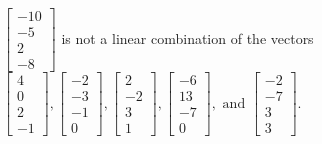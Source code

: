 \begin{exercise}
\begin{exerciseStatement}
  \end{exerciseStatement}
  \begin{exerciseAnswer}
   \(\left[\begin{array}{c}
-10 \\
-5 \\
2 \\
-8
\end{array}\right]\) 
  	 is not  
	a linear combination of the vectors \(\left[\begin{array}{c}
4 \\
0 \\
2 \\
-1
\end{array}\right] , \left[\begin{array}{c}
-2 \\
-3 \\
-1 \\
0
\end{array}\right] , \left[\begin{array}{c}
2 \\
-2 \\
3 \\
1
\end{array}\right] , \left[\begin{array}{c}
-6 \\
13 \\
-7 \\
0
\end{array}\right] , \text{ and } \left[\begin{array}{c}
-2 \\
-7 \\
3 \\
3
\end{array}\right]\).

	
  


  \end{exerciseAnswer}
\end{exercise}